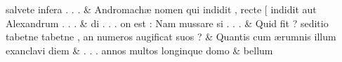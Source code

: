 \documentclass[12pt,onecolumn,twoside,a4paper]{memoir}
\begin{document}
\begin{pairs}
\begin{Leftside}
                              salvete
                              infera
                              .
                              .
                              . \&
                         \stanza {}
                     Andromachæ
                              nomen
                              qui
                              indidit
                              ,
                              recte
                              [
                              indidit
                              aut
                              Alexandrum
                              .
                              .
                              . \&
                         \stanza {}
                     di
                              .
                              .
                              .
                              on
                              est
                              :
                              Nam
                              mussare
                              si
                              .
                              .
                              . \&
                         \stanza {}
                     Quid
                              fit
                              ?
                              seditio
                              tabetne
                              {tabetne}
                              ,
                              an
                              numeros
                              augificat
                              suos
                              ? \&
                         \stanza {}
                     Quantis
                              cum
                              ærumnis
                              illum
                              exanclavi
                              diem \&
                         \stanza {}.
                              .
                              .
                              annos
                              multos
                              longinque
                              domo & 
                     bellum

\end{Leftside}
\end{pairs}
\end{document}
